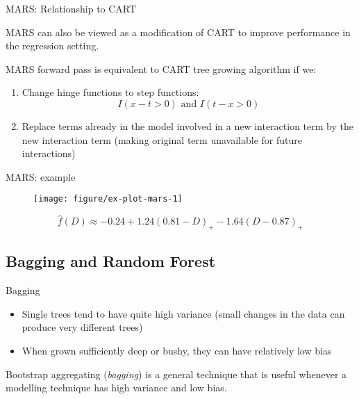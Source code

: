 \documentclass{beamer}
\begin{document}
\begin{frame}{MARS: Relationship to CART}
  
  MARS can also be viewed as a modification of CART to improve performance in the regression setting.
  
  MARS forward pass is equivalent to CART tree growing algorithm if we:
  \begin{enumerate}
    \item Change hinge functions to step functions:
    \begin{equation*}
      I(x - t > 0) \text{ and } I(t - x > 0)
    \end{equation*}
    \item Replace terms already in the model involved in a new interaction term by the new interaction term (making original term unavailable for future interactions)
  \end{enumerate}
\end{frame}


\begin{frame}[t]{MARS: example}

\begin{figure}[!htbp]
\begin{center}
  \texttt{[image: figure/ex-plot-mars-1]}
\end{center}
\end{figure}
%
\begin{equation*}
  \label{eq:mars-eqn}
  \hat{f}(D) \approx -0.24 + 1.24 (0.81 - D)_{+} -1.64 (D - 0.87)_{+}
\end{equation*}

\end{frame}


\subsection{Bagging and Random Forest} %
\label{sub:bagging_and_random}

\begin{frame}{Bagging}
  
  \begin{itemize}
    \item Single trees tend to have quite high variance (small changes in the data can produce very different trees)
    \item When grown sufficiently deep or bushy, they can have relatively low bias 
  \end{itemize}
  
  Bootstrap aggregating (\emph{bagging}) is a general technique that is useful whenever a modelling technique has high variance and low bias.
  
\end{frame}
\end{document}
